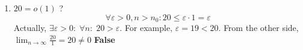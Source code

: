 \begin{enumerate}
    \item $20 = o(1)$ ?
        \[\forall \varepsilon > 0, n > n_0: 20 \le \varepsilon \cdot 1 = \varepsilon\]
        Actually, $\exists \varepsilon > 0 :\; \forall n:\; 20 > \varepsilon $. For example, $\varepsilon = 19 < 20$.
        From the other side, $\lim_{n\to\infty}\frac{20}{1} = 20 \ne 0$
        \qedsymbol \quad \textbf{False}
        
\end{enumerate}
